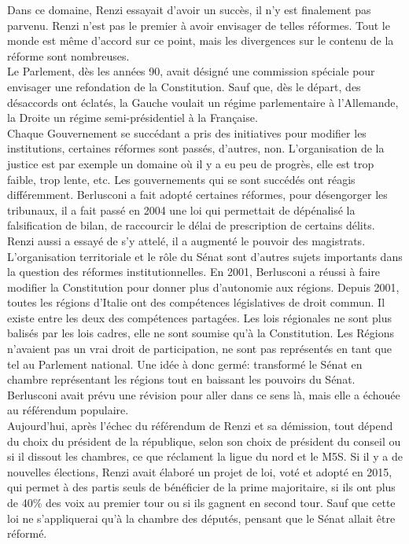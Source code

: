 \documentclass[10pt, a4paper, openany]{book}
\begin{document}
Dans ce domaine, Renzi essayait d'avoir un succès, il n'y est finalement pas parvenu. Renzi n'est pas le premier à avoir envisager de telles réformes. Tout le monde est même d'accord sur ce point, mais les divergences sur le contenu de la réforme sont nombreuses. \\
Le Parlement, dès les années 90, avait désigné une commission spéciale pour envisager une refondation de la Constitution. Sauf que, dès le départ, des désaccords ont éclatés, la Gauche voulait un régime parlementaire à l'Allemande, la Droite un régime semi-présidentiel à la Française. \\
Chaque Gouvernement se succédant a pris des initiatives pour modifier les institutions, certaines réformes sont passés, d'autres, non. L'organisation de la justice est par exemple un domaine où il y a eu peu de progrès, elle est trop faible, trop lente, etc. Les gouvernements qui se sont succédés ont réagis différemment. Berlusconi a fait adopté certaines réformes, pour désengorger les tribunaux, il a fait passé en 2004 une loi qui permettait de dépénalisé la falsification de bilan, de raccourcir le délai de prescription de certains délits. Renzi aussi a essayé de s'y attelé, il a augmenté le pouvoir des magistrats. \\
L'organisation territoriale et le rôle du Sénat sont d'autres sujets importants dans la question des réformes institutionnelles. En 2001, Berlusconi a réussi à faire modifier la Constitution pour donner plus d'autonomie aux régions. Depuis 2001, toutes les régions d'Italie ont des compétences législatives de droit commun. Il existe entre les deux des compétences partagées. Les lois régionales ne sont plus balisés par les lois cadres, elle ne sont soumise qu'à la Constitution. Les Régions n'avaient pas un vrai droit de participation, ne sont pas représentés en tant que tel au Parlement national. Une idée à donc germé: transformé le Sénat en chambre représentant les régions tout en baissant les pouvoirs du Sénat. Berlusconi avait prévu une révision pour aller dans ce sens là, mais elle a échouée au référendum populaire. \\
Aujourd'hui, après l'échec du référendum de Renzi et sa démission, tout dépend du choix du président de la république, selon son choix de président du conseil ou si il dissout les chambres, ce que réclament la ligue du nord et le M5S. Si il y a de nouvelles élections, Renzi avait élaboré un projet de loi, voté et adopté en 2015, qui permet à des partis seuls de bénéficier de la prime majoritaire, si ils ont plus de 40\% des voix au premier tour ou si ils gagnent en second tour. Sauf que cette loi ne s'appliquerai qu'à la chambre des députés, pensant que le Sénat allait être réformé. 
\end{document}
